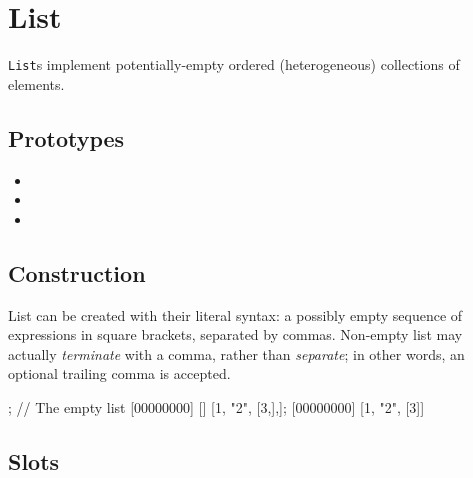 \section{List}

\lstinline|List|s implement potentially-empty ordered (heterogeneous)
collections of elements.

\subsection{Prototypes}

\begin{itemize}
\item {}
\item {}
\item {}
\end{itemize}

\subsection{Construction}

List can be created with their literal syntax: a possibly empty
sequence of expressions in square brackets, separated by commas.
Non-empty list may actually \emph{terminate} with a comma, rather than
\emph{separate}; in other words, an optional trailing comma is accepted.

\begin{urbiscript}[firstnumber=1]
[]; // The empty list
[00000000] []
[1, "2", [3,],];
[00000000] [1, "2", [3]]
\end{urbiscript}

\subsection{Slots}

